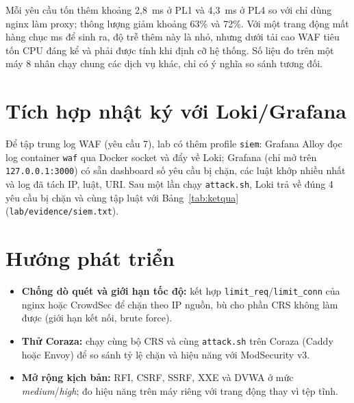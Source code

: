Mỗi yêu cầu tốn thêm khoảng 2,8~ms ở PL1 và 4,3~ms ở PL4 so với chỉ dùng nginx làm proxy; thông lượng giảm khoảng 63\% và 72\%. Với một trang động mất hàng chục ms để sinh ra, độ trễ thêm này là nhỏ, nhưng dưới tải cao WAF tiêu tốn CPU đáng kể và phải được tính khi định cỡ hệ thống. Số liệu đo trên một máy 8 nhân chạy chung các dịch vụ khác, chỉ có ý nghĩa so sánh tương đối.

\section{Tích hợp nhật ký với Loki/Grafana}\label{sec:siem}
Để tập trung log WAF (yêu cầu 7), lab có thêm profile \texttt{siem}: Grafana Alloy đọc log container \texttt{waf} qua Docker socket và đẩy về Loki; Grafana (chỉ mở trên \texttt{127.0.0.1:3000}) có sẵn dashboard số yêu cầu bị chặn, các luật khớp nhiều nhất và log đã tách IP, luật, URI. Sau một lần chạy \texttt{attack.sh}, Loki trả về đúng 4 yêu cầu bị chặn và cùng tập luật với Bảng~\ref{tab:ketqua} (\texttt{lab/evidence/siem.txt}).

\section{Hướng phát triển}
\begin{itemize}
  \item \textbf{Chống dò quét và giới hạn tốc độ:} kết hợp \texttt{limit\_req}/\texttt{limit\_conn} của nginx hoặc CrowdSec để chặn theo IP nguồn, bù cho phần CRS không làm được (giới hạn kết nối, brute force).
  \item \textbf{Thử Coraza:} chạy cùng bộ CRS và cùng \texttt{attack.sh} trên Coraza (Caddy hoặc Envoy) để so sánh tỷ lệ chặn và hiệu năng với ModSecurity v3.
  \item \textbf{Mở rộng kịch bản:} RFI, CSRF, SSRF, XXE và DVWA ở mức \textit{medium}/\textit{high}; đo hiệu năng trên máy riêng với trang động thay vì tệp tĩnh.
\end{itemize}

